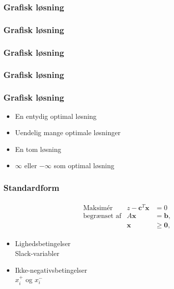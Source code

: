 \begin{frame}
\frametitle{Grafisk løsning}

\end{frame}

\begin{frame}
\frametitle{Grafisk løsning}

\end{frame}

\begin{frame}
\frametitle{Grafisk løsning}

\end{frame}

\begin{frame}
\frametitle{Grafisk løsning}

\end{frame}

\begin{frame}
\frametitle{Grafisk løsning}
\begin{itemize}
\item En entydig optimal løsning
\item Uendelig mange optimale løsninger 
\item En tom løsning
\item $\infty$ eller $-\infty$ som optimal løsning  
\end{itemize}
\end{frame}

\begin{frame}
\frametitle{Standardform}
\begin{align*}
\begin{array}{lrl}
\text{Maksimér}		&z - \textbf{c}^T\textbf{x}	&	=0		\\
\text{begrænset af}	&A\textbf{x}	&=\mathbf{b},	\\
					&\mathbf{x}				&\geq \mathbf{0},
\end{array}
\end{align*}
\begin{itemize}
\item Lighedsbetingelser \\
 		Slack-variabler
\item Ikke-negativsbetingelser \\ 
		$x_i^+$ og $x_i^-$
\end{itemize}
\end{frame}

